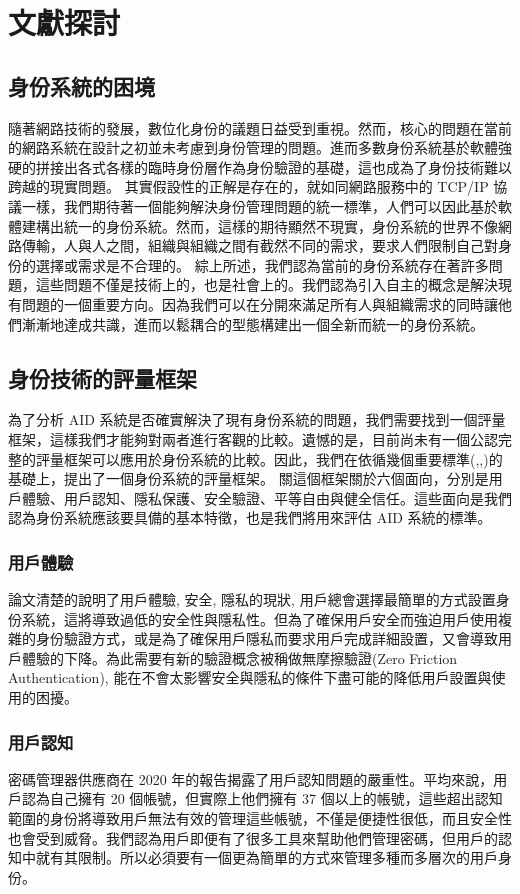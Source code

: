 
\chapter{文獻探討}
\section{身份系統的困境}
隨著網路技術的發展，數位化身份的議題日益受到重視。然而，核心的問題在當前的網路系統在設計之初並未考慮到身份管理的問題\cite{cameron2005laws}。進而多數身份系統基於軟體強硬的拼接出各式各樣的臨時身份層作為身份驗證的基礎，這也成為了身份技術難以跨越的現實問題。
其實假設性的正解是存在的，就如同網路服務中的 TCP/IP 協議一樣，我們期待著一個能夠解決身份管理問題的統一標準，人們可以因此基於軟體建構出統一的身份系統。然而，這樣的期待顯然不現實，身份系統的世界不像網路傳輸，人與人之間，組織與組織之間有截然不同的需求，要求人們限制自己對身份的選擇或需求是不合理的。
綜上所述，我們認為當前的身份系統存在著許多問題，這些問題不僅是技術上的，也是社會上的。我們認為引入自主的概念是解決現有問題的一個重要方向。因為我們可以在分開來滿足所有人與組織需求的同時讓他們漸漸地達成共識，進而以鬆耦合的型態構建出一個全新而統一的身份系統。
\section{身份技術的評量框架}
為了分析 AID 系統是否確實解決了現有身份系統的問題，我們需要找到一個評量框架，這樣我們才能夠對兩者進行客觀的比較。遺憾的是，目前尚未有一個公認完整的評量框架可以應用於身份系統的比較。因此，我們在依循幾個重要標準(\cite{GDPR2016},\cite{DIDCore},\cite{NIST800-63-3})的基礎上，提出了一個身份系統的評量框架。
關這個框架關於六個面向，分別是用戶體驗、用戶認知、隱私保護、安全驗證、平等自由與健全信任。這些面向是我們認為身份系統應該要具備的基本特徵，也是我們將用來評估 AID 系統的標準。
\subsection{用戶體驗}
論文\cite{inproceedings}清楚的說明了用戶體驗, 安全, 隱私的現狀, 用戶總會選擇最簡單的方式設置身份系統，這將導致過低的安全性與隱私性。但為了確保用戶安全而強迫用戶使用複雜的身份驗證方式，或是為了確保用戶隱私而要求用戶完成詳細設置，又會導致用戶體驗的下降。為此需要有新的驗證概念被稱做無摩擦驗證(Zero Friction Authentication), 能在不會太影響安全與隱私的條件下盡可能的降低用戶設置與使用的困擾。
\subsection{用戶認知}
密碼管理器供應商在 2020 年的報告\cite{lastpass2020psychology}揭露了用戶認知問題的嚴重性。平均來說，用戶認為自己擁有 20 個帳號，但實際上他們擁有 37 個以上的帳號，這些超出認知範圍的身份將導致用戶無法有效的管理這些帳號，不僅是便捷性很低，而且安全性也會受到威脅。我們認為用戶即便有了很多工具來幫助他們管理密碼，但用戶的認知中就有其限制。所以必須要有一個更為簡單的方式來管理多種而多層次的用戶身份。
